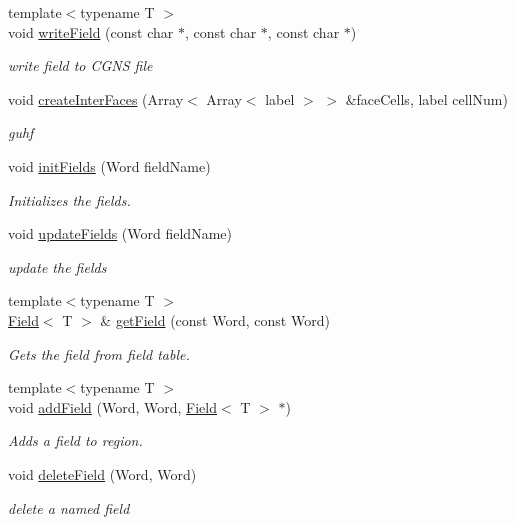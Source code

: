 \begin{DoxyCompactItemize}
{\footnotesize template$<$typename T $>$ }\\void \hyperlink{classHSF_1_1Region_a2298d4a70a05cfef042c077410c3c29b}{writeField} (const char $\ast$, const char $\ast$, const char $\ast$)
\begin{DoxyCompactList}\small\item\em write field to CGNS file \item\end{DoxyCompactList}\item 
void \hyperlink{classHSF_1_1Region_a39c7b59ebdc736618d652d53d1dace0b}{createInterFaces} (Array$<$ Array$<$ label $>$ $>$ \&faceCells, label cellNum)
\begin{DoxyCompactList}\small\item\em guhf \item\end{DoxyCompactList}\item 
void \hyperlink{classHSF_1_1Region_a04109e318bad70575bf6aa0f810913bf}{initFields} (Word fieldName)
\begin{DoxyCompactList}\small\item\em Initializes the fields. \item\end{DoxyCompactList}\item 
void \hyperlink{classHSF_1_1Region_a4a3da7e779636d389f013301006a02b4}{updateFields} (Word fieldName)
\begin{DoxyCompactList}\small\item\em update the fields \item\end{DoxyCompactList}\item 
{\footnotesize template$<$typename T $>$ }\\\hyperlink{classHSF_1_1Field}{Field}$<$ T $>$ \& \hyperlink{classHSF_1_1Region_a2fc8f3916190395f4b43547755113c8e}{getField} (const Word, const Word)
\begin{DoxyCompactList}\small\item\em Gets the field from field table. \item\end{DoxyCompactList}\item 
{\footnotesize template$<$typename T $>$ }\\void \hyperlink{classHSF_1_1Region_aec3f0520f9618a0e0d92a5c2a102b980}{addField} (Word, Word, \hyperlink{classHSF_1_1Field}{Field}$<$ T $>$ $\ast$)
\begin{DoxyCompactList}\small\item\em Adds a field to region. \item\end{DoxyCompactList}\item 
void \hyperlink{classHSF_1_1Region_ab74797105c6eaf54c3d5101a919d15b6}{deleteField} (Word, Word)
\begin{DoxyCompactList}\small\item\em delete a named field \item\end{DoxyCompactList}\end{DoxyCompactItemize}


